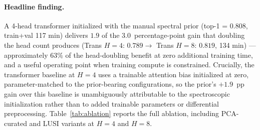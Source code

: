 \documentclass[preprint,12pt]{elsarticle}
\begin{document}
\paragraph{Headline finding.}
A 4-head transformer initialized with the manual spectral prior (top-1 = 0.808, train+val 117 min) delivers $1.9$ of the $3.0$~percentage-point gain that doubling the head count produces (Trans $H = 4$: $0.789 \to$ Trans $H = 8$: $0.819$, 134 min) --- approximately $63\%$ of the head-doubling benefit at zero additional training time, and a useful operating point when training compute is constrained. Crucially, the transformer baseline at $H = 4$ uses a trainable attention bias initialized at zero, parameter-matched to the prior-bearing configurations, so the prior's $+1.9$~pp gain over this baseline is unambiguously attributable to the spectroscopic initialization rather than to added trainable parameters or differential preprocessing. Table~\ref{tab:ablation} reports the full ablation, including PCA-curated and LUSI variants at $H = 4$ and $H = 8$.
\end{document}
